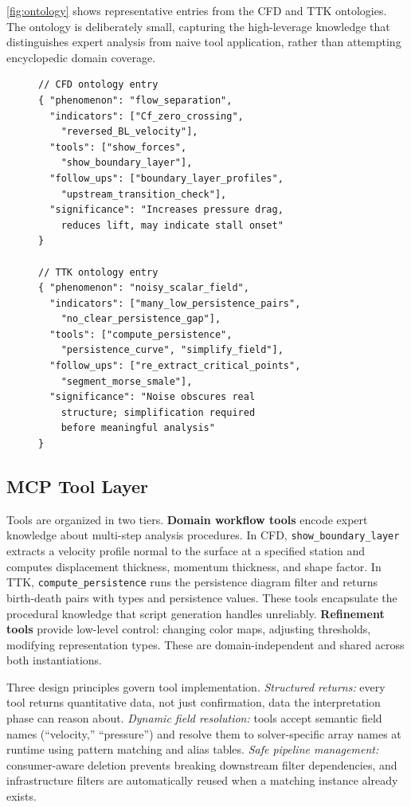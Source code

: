 \documentclass{vgtc}                          %
\begin{document}
\autoref{fig:ontology} shows representative entries from the CFD and TTK
ontologies.
The ontology is deliberately small, capturing the high-leverage knowledge that
distinguishes expert analysis from naive tool application, rather than
attempting encyclopedic domain coverage.

\begin{figure}[tb]
\centering
\begin{lstlisting}[basicstyle=\scriptsize\ttfamily,frame=single,
  caption={Representative ontology entries.},label={fig:ontology},
  captionpos=b,abovecaptionskip=5pt]
// CFD ontology entry
{ "phenomenon": "flow_separation",
  "indicators": ["Cf_zero_crossing",
    "reversed_BL_velocity"],
  "tools": ["show_forces", 
    "show_boundary_layer"],
  "follow_ups": ["boundary_layer_profiles",
    "upstream_transition_check"],
  "significance": "Increases pressure drag,
    reduces lift, may indicate stall onset"
}

// TTK ontology entry
{ "phenomenon": "noisy_scalar_field",
  "indicators": ["many_low_persistence_pairs",
    "no_clear_persistence_gap"],
  "tools": ["compute_persistence",
    "persistence_curve", "simplify_field"],
  "follow_ups": ["re_extract_critical_points",
    "segment_morse_smale"],
  "significance": "Noise obscures real 
    structure; simplification required 
    before meaningful analysis"
}
\end{lstlisting}
\end{figure}

\subsection{MCP Tool Layer}

Tools are organized in two tiers.
\textbf{Domain workflow tools} encode expert knowledge about multi-step
analysis procedures.
In CFD, \texttt{show\_boundary\_layer} extracts a velocity profile normal to
the surface at a specified station and computes displacement thickness,
momentum thickness, and shape factor.
In TTK, \texttt{compute\_persistence} runs the persistence diagram filter and
returns birth-death pairs with types and persistence values.
These tools encapsulate the procedural knowledge that script generation handles
unreliably.
\textbf{Refinement tools} provide low-level control: changing color maps,
adjusting thresholds, modifying representation types.
These are domain-independent and shared across both instantiations.

Three design principles govern tool implementation.
\textit{Structured returns:} every tool returns quantitative data, not just
confirmation, data the interpretation phase can reason about.
\textit{Dynamic field resolution:} tools accept semantic field names
(``velocity,'' ``pressure'') and resolve them to solver-specific array names
at runtime using pattern matching and alias tables.
\textit{Safe pipeline management:} consumer-aware deletion prevents breaking
downstream filter dependencies, and infrastructure filters are automatically
reused when a matching instance already exists.
\end{document}
